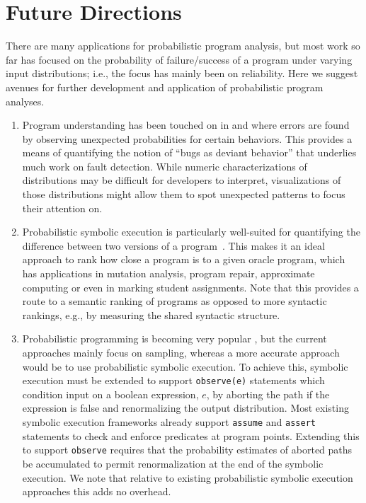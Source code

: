 \section{Future Directions}
\label{sec:future}

There are many applications for probabilistic program analysis, but most work so far has focused on the probability of failure/success of a program under varying input distributions; i.e., the focus has mainly been on reliability.
Here we suggest avenues for further development and application of
probabilistic program analyses.

\begin{enumerate}

\item Program understanding has been touched on in \cite{Geldenhuys2012} and \cite{Filieri2015} where errors are found by observing unexpected probabilities for certain behaviors.  This provides a means of quantifying the notion of ``bugs as deviant behavior'' that underlies much work on fault detection.   While numeric characterizations of distributions may be difficult for developers to interpret, visualizations of those distributions might allow them to spot unexpected patterns to focus their attention on.

\item Probabilistic symbolic execution is particularly well-suited for quantifying the difference between two versions of a program~\cite{Filieri2015b}. This makes it an ideal approach to rank how close a program is to a given oracle program, which has applications in mutation analysis, program repair, approximate computing or even in marking student assignments.  Note that this provides a route to a semantic ranking of programs as opposed to more syntactic rankings, e.g., by measuring the shared syntactic structure. 

\item Probabilistic programming is becoming very popular \cite{Gordon2014}, but the current approaches mainly focus on sampling, whereas a more accurate approach would be to use probabilistic symbolic execution.  
To achieve this, symbolic execution must be extended to support
\texttt{observe(e)} statements which condition input on a boolean expression,
$e$, by aborting the path if the expression is false and renormalizing the
output distribution.
Most existing symbolic execution frameworks already support \texttt{assume} and \texttt{assert} statements to check and enforce predicates at program points.
Extending this to support \texttt{observe} requires that the probability
estimates of aborted paths be accumulated to permit renormalization at the
end of the symbolic execution.  We note that relative to existing probabilistic
symbolic execution approaches this adds no overhead.


\end{enumerate}
